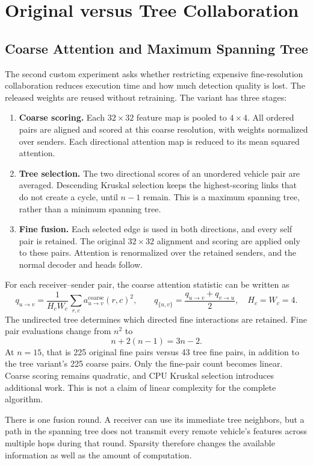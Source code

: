 \section{Original versus Tree Collaboration}
\label{sec:tree}
\subsection{Coarse Attention and Maximum Spanning Tree}
The second custom experiment asks whether restricting expensive
fine-resolution collaboration reduces execution time and how much detection
quality is lost. The released weights are reused without retraining.
The variant has three stages:
\begin{enumerate}
  \item \textbf{Coarse scoring.} Each $32\times32$ feature map is pooled to
    $4\times4$. All ordered pairs are aligned and scored at this coarse
    resolution, with weights normalized over senders. Each directional
    attention map is reduced to its mean squared attention.
  \item \textbf{Tree selection.} The two directional scores of an unordered
    vehicle pair are averaged. Descending Kruskal selection keeps the
    highest-scoring links that do not create a cycle, until $n-1$ remain.
    This is a maximum spanning tree, rather than a minimum spanning tree.
  \item \textbf{Fine fusion.} Each selected edge is used in both directions,
    and every self pair is retained. The original $32\times32$ alignment and
    scoring are applied only to these pairs. Attention is renormalized over
    the retained senders, and the normal decoder and heads follow.
\end{enumerate}

For each receiver--sender pair, the coarse attention statistic can be written
as
\[
 q_{u\to v}=\frac{1}{H_cW_c}\sum_{r,c}a^{\mathrm{coarse}}_{u\to v}(r,c)^2,
 \qquad q_{\{u,v\}}=\frac{q_{u\to v}+q_{v\to u}}{2},
 \quad H_c=W_c=4.
\]
The undirected tree determines which directed fine interactions are retained.
Fine pair evaluations change from $n^2$ to
\[
 n+2(n-1)=3n-2.
\]
At $n=15$, that is 225 original fine pairs versus 43 tree fine pairs, in
addition to the tree variant's 225 coarse pairs. Only the fine-pair count
becomes linear. Coarse scoring remains quadratic, and CPU Kruskal selection
introduces additional work. This is not a claim of linear complexity for the
complete algorithm.

There is one fusion round. A receiver can use its immediate tree neighbors,
but a path in the spanning tree does not transmit every remote vehicle's
features across multiple hops during that round. Sparsity therefore changes
the available information as well as the amount of computation.

